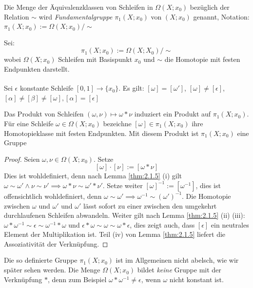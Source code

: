 \documentclass[a4paper,10pt]{scrartcl}
\begin{document}
\begin{df}
 Die Menge der Äquivalenzklassen von Schleifen in $\Omega(X;x_0)$ bezüglich der Relation $\sim$ wird \emph{Fundamentalgruppe} $\pi_1(X; x_0)$ von $(X;x_0)$ genannt, Notation: $\pi_1(X;x_0):= \Omega(X;x_0)/\sim$
\end{df}
Sei:
\[
 \pi_1(X;x_0):= \Omega(X;X_0)/\sim 
\]
wobei $\Omega(X;x_0)$ Schleifen mit Basispunkt $x_0$ und $\sim$ die Homotopie mit festen Endpunkten darstellt.\\
\fixme[fig56]\\
Sei $\epsilon$ konstante Schleife $[0,1]\to \{x_0\}$.
Es gilt: $[\omega]=[\omega']$, $[\omega]\neq [\epsilon]$, $[\alpha]\neq [\beta]\neq [\omega], [\alpha]=[\epsilon]$
\begin{st}
 Das Produkt von Schleifen $(\omega, \nu) \mapsto \omega * \nu$ induziert ein Produkt auf $\pi_1(X;x_0)$. Für 
eine Schleife $\omega \in \Omega(X;x_0)$ bezeichne $[\omega] \in \pi_1(X; x_0)$ ihre Homotopieklasse mit festen Endpunkten. Mit diesem Produkt ist $\pi_1(X;x_0)$ eine Gruppe
\end{st}
\begin{proof}
 Seien $\omega, \nu \in \Omega(X; x_0)$. Setze 
\[
 [\omega] \cdot [\nu]:=[\omega*\nu]
\]
Dies ist wohldefiniert, denn nach Lemma \ref{thm:2.1.5} (i) gilt $\omega \sim \omega' \land \nu \sim \nu' \implies \omega * \nu \sim \omega' * \nu'$. Setze weiter $[\omega]^{-1}:=[\omega^{-1}]$, dies ist offensichtlich wohldefiniert, denn $\omega \sim \omega' \implies \omega^{-1}\sim (\omega')^{-1}$. Die Homotopie zwischen $\omega$ und $\omega'$ und $\omega'$ lässt sofort zu einer zwischen den umgekehrt durchlaufenen Schleifen abwandeln. Weiter gilt nach Lemma \ref{thm:2.1.5} (ii) (iii): $\omega*\omega^{-1}\sim \epsilon \sim \omega^{-1}*\omega$ und $\epsilon*\omega\sim \omega \sim \omega*\epsilon$, dies zeigt auch, dass $[\epsilon]$ ein neutrales Element der Multiplikation ist. Teil (iv) von Lemma \ref{thm:2.1.5} liefert die Assoziativität der Verknüpfung. 
\end{proof}
Die so definierte Gruppe $\pi_1(X;x_0)$ ist im Allgemeinen nicht abelsch, wie wir später sehen werden. Die Menge $\Omega(X;x_0)$ bildet \emph{keine} Gruppe mit der Verknüpfung $*$, denn zum Beispiel $\omega*\omega^{-1}\neq \epsilon$, wenn $\omega$ nicht konstant ist.
\end{document}
